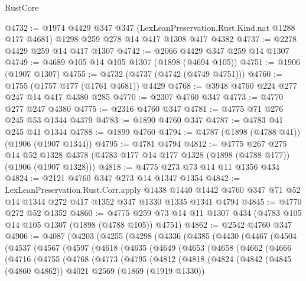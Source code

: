 \begin{lexlean}{RustCore}
\begin{coremodule}
@4732 := @1974
    @4429
    @347
    @347
    (LexLeanPreservation.Rust.Kind.nat @1288 @177 @4681)
    @1298
    @259
    @278
    @14
    @417
    @1308
    @417
    @4382
@4737 := @2278 @4429 @259 @14 @417 @1307
@4742 := @2066 @4429 @347 @259 @14 @1307
@4749 := @4689 @105 @14 @105 @1307 (@1898 (@4694 @105))
@4751 := @1906 (@1907 @1307)
@4755 := @4732 (@4737 (@4742 (@4749 @4751)))
@4760 := @1755 (@1757 @177 (@1761 @4681)) @4429
@4768 := @3948 @4760 @224 @277 @247 @14 @417 @4380 @285
@4770 := @2307 @4760 @347
@4773 := @4770 @277 @247 @4380
@4775 := @2316 @4760 @347
@4781 := @4775 @71 @276 @245 @53 @1344 @4379
@4783 := @1890 @4760 @347
@4787 := @4783 @41 @245 @41 @1344
@4788 := @1899 @4760
@4794 := @4787 (@1898 (@4788 @41)) (@1906 (@1907 @1344))
@4795 := @4781 @4794
@4812 := @4775
    @267
    @275
    @14
    @52
    @1328
    @4378
    (@4783 @177 @14 @177 @1328 (@1898 (@4788 @177)) (@1906 (@1907 @1328)))
@4818 := @4775 @273 @73 @14 @11 @1356 @434
@4824 := @2121 @4760 @347 @273 @14 @1347 @1354
@4842 := LexLeanPreservation.Rust.Corr.apply
    @1438
    @1440
    @1442
    @4760
    @347
    @71
    @52
    @14
    @1344
    @272
    @417
    @1352
    @347
    @1330
    @1335
    @1341
    @4794
@4845 := @4770 @272 @52 @1352
@4860 := @4775 @259 @73 @14 @11 @1307 @434 (@4783 @105 @14 @105 @1307 (@1898 (@4788 @105)) @4751)
@4862 := @2542 @4760 @347
@4906 := @4087
    (@4203
      (@4255
        (@4298
          (@4336
            (@4385
              (@4430
                (@4467
                  (@4504
                    (@4537
                      (@4567
                        (@4597
                          (@4618
                            (@4635
                              (@4649
                                (@4653
                                  (@4658
                                    (@4662
                                      (@4666
                                        (@4716
                                          (@4755
                                            (@4768
                                              (@4773
                                                (@4795
                                                  (@4812
                                                    (@4818
                                                      (@4824
                                                        (@4842
                                                          (@4845 (@4860 @4862))
                                                          @4021
                                                          @2569
                                                          (@1869 (@1919 @1330))

\end{coremodule}
\end{lexlean}
